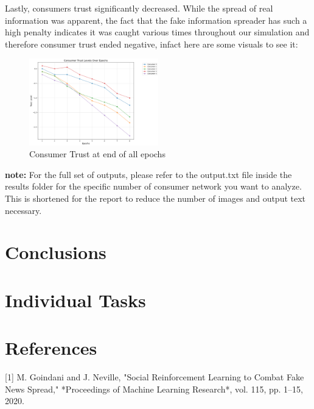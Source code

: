 \documentclass[twoside]{article}
\begin{document}
Lastly, consumers trust significantly decreased. While the spread of real information was apparent, the fact that the fake information spreader has such a high penalty indicates it was caught various times throughout our simulation and therefore consumer trust ended negative, infact here are some visuals to see it:

\begin{figure}[htbp]
     \centering
     \includegraphics[width=0.5\textwidth]{../results/images/consumertrust.png}
     \caption{Consumer Trust at end of all epochs}
     \label{fig: 52 consumer, 3 agents}
 \end{figure}

\textbf{note:} For the full set of outputs, please refer to the output.txt file inside the results folder for the specific number of consumer network you want to analyze. This is shortened for the report to reduce the number of images and output text necessary.

\section{Conclusions}

\section{Individual Tasks}

\section{References}
[1] M. Goindani and J. Neville, "Social Reinforcement Learning to Combat Fake News Spread," *Proceedings of Machine Learning Research*, vol. 115, pp. 1–15, 2020.



%
\end{document}
